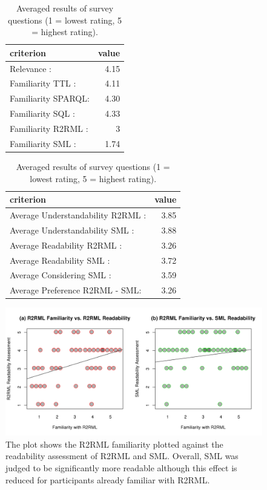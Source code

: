 \begin{table}[!t]
\begin{subfigure}[c]{0.45\textwidth}
\begin{tabular}{@{}lr@{}}
 criterion & value \\\toprule
Relevance : & 4.15 \\
Familiarity TTL :  & 4.11 \\
Familiarity SPARQL:  & 4.30 \\
Familiarity SQL :  & 4.33 \\
Familiarity R2RML :  & 3 \\
Familiarity SML :  & 1.74 \\
\end{tabular}
\end{subfigure}
\begin{subfigure}[c]{0.45\textwidth}
\begin{tabular}{@{}lr@{}}
 criterion & value \\\toprule
Average Understandability R2RML : & 3.85 \\
Average Understandability SML : & 3.88 \\
Average Readability R2RML : & 3.26 \\
Average Readability SML : & 3.72 \\
Average Considering SML  : & 3.59 \\
Average Preference R2RML - SML: &  3.26
\end{tabular}
\end{subfigure}
\caption{Averaged results of survey questions (1 = lowest rating, 5 = highest rating).}
\label{tab:eval_overview}
\end{table}

\begin{figure}[!t]
 \includegraphics[width=\textwidth]{pics/fam_vs_read}
 \caption{The plot shows the R2RML familiarity plotted against the readability assessment of R2RML and SML. Overall, SML was judged to be significantly more readable although this effect is reduced for participants already familiar with R2RML.}
 \label{fig:fam_vs_read}
\end{figure}


